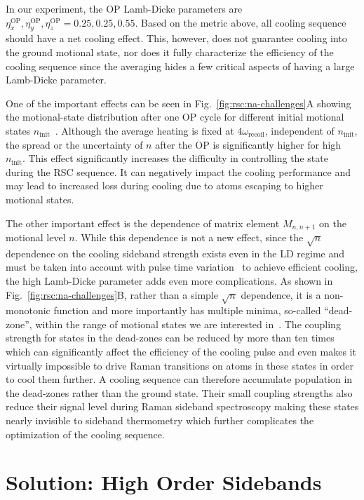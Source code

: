 In our experiment, the OP Lamb-Dicke parameters are
$\eta^{\mathrm{OP}}_x, \eta^{\mathrm{OP}}_y, \eta^{\mathrm{OP}}_z = 0.25, 0.25, 0.55$.
Based on the metric above, all cooling sequence should have a net cooling effect.
This, however, does not guarantee cooling into the ground motional state,
nor does it fully characterize the efficiency of the cooling sequence
since the averaging hides a few critical aspects of having a large Lamb-Dicke parameter.

One of the important effects can be seen in Fig.~\ref{fig:rsc:na-challenges}A showing
the motional-state distribution after one OP cycle
for different initial motional states $n_{\mathrm{init}}$~\cite{wineland_laser_1979}.
Although the average heating is fixed at $4\omega_{\mathrm{recoil}}$,
independent of $n_{\mathrm{init}}$,
the spread or the uncertainty of $n$ after the OP is significantly
higher for high $n_{\mathrm{init}}$.
This effect significantly increases the difficulty in controlling the state during the
RSC sequence. It can negatively impact the cooling performance and
may lead to increased loss during cooling due to atoms escaping to higher motional states.

The other important effect is the dependence of matrix element $M_{n,n+1}$
on the motional level $n$.
While this dependence is not a new effect, since the $\sqrt{n}$ dependence
on the cooling sideband strength exists even in the LD regime
and must be taken into account with
pulse time variation~\cite{wineland_experimental_1998,liu_molecular_2019}
to achieve efficient cooling, the high Lamb-Dicke parameter adds even more complications.
As shown in Fig.~\ref{fig:rsc:na-challenges}B, rather than a simple $\sqrt{n}$ dependence,
it is a non-monotonic function and more importantly has multiple minima, so-called ``dead-zone'',
within the range of motional states we are interested in~\cite{wineland_laser_1979}.
The coupling strength for states in the dead-zones can be reduced by more than ten times
which can significantly affect the efficiency of the cooling pulse
and even makes it virtually impossible to drive Raman transitions on atoms in these states
in order to cool them further.
A cooling sequence can therefore accumulate population in the dead-zones
rather than the ground state.
Their small coupling strengths also reduce their signal level during
Raman sideband spectroscopy making these states nearly invisible to sideband thermometry
which further complicates the optimization of the cooling sequence.

\section{Solution: High Order Sidebands}
\label{ch:rsc:solution-high-orders}

